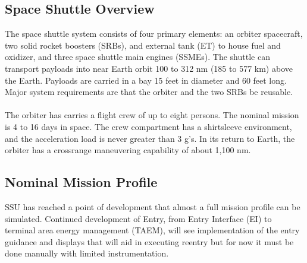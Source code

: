 \documentclass[13pt, letter,final]{article}
\begin{document}
\begin{multicols}{2}

\subsection*{\large Space Shuttle Overview}
The space shuttle system consists of four primary elements: an orbiter spacecraft, two solid rocket boosters (SRBs), and external tank (ET) to house fuel and oxidizer, and three space shuttle main engines (SSMEs). The shuttle can transport payloads into near Earth orbit 100 to 312 nm (185 to 577 km) above the Earth. Payloads are carried in a bay 15 feet in diameter and 60 feet long. Major system requirements are that the orbiter and the two SRBs be reusable.\\
\\
The orbiter has carries a flight crew of up to eight persons. The nominal mission is 4 to 16 days in space. The crew compartment has a shirtsleeve environment, and the acceleration load is never greater than 3 g's. In its return to Earth, the orbiter has a crossrange maneuvering capability of about 1,100 nm.\\

\subsection*{\large Nominal Mission Profile}
SSU has reached a point of development that almost a full mission profile can be simulated. Continued development of Entry, from Entry Interface (EI) to terminal area energy management (TAEM), will see implementation of the entry guidance and displays that will aid in executing reentry but for now it must be done manually with limited instrumentation.\\
\\
\begin{center}

\end{center}
\end{multicols}
\end{document}
